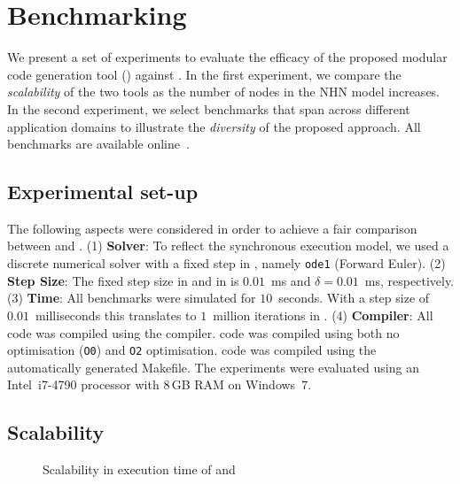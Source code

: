 \section{Benchmarking}
\label{sec:benchmarking}

We present a set of experiments to evaluate the efficacy of the proposed
modular code generation tool (\ourTool) against \simulink.  In the first 
experiment, we compare the \emph{scalability} of the two tools as the 
number of nodes in the \ac{NHN} model increases.  In the second experiment, we 
select benchmarks that span across different application domains 
to illustrate the \emph{diversity} 
of the proposed approach.  All benchmarks are 
available online~\cite{DATEBenchmarks}.


\subsection{Experimental set-up}
\label{sec:experimentalSetUp}
The following aspects were considered in order to achieve a fair
comparison between \ourTool and \simulink. 
(1) \textbf{Solver}: To reflect the synchronous execution model, we
  used a discrete numerical solver with a fixed step in \simulink,
  namely \texttt{ode1} (Forward Euler).
(2) 
\textbf{Step Size}: The fixed step size in \simulink and in \ourTool
  is  $0.01$~ms and $\delta = 0.01$~ms, respectively.
(3) 
\textbf{Time}: All benchmarks were simulated for $10$~seconds.
  With a step size of $0.01$~milliseconds this
  translates to $1$~million iterations in \ourTool.
  (4)
\textbf{Compiler}: All code was compiled using the \compiler
  compiler.  \ourTool code was compiled using both no optimisation
  (\texttt{O0}) and \texttt{O2} optimisation.  \simulink code was
  compiled using the automatically generated Makefile.
The experiments were evaluated using an Intel~i7-4790 processor with
$8$\,GB RAM on Windows~$7$.



\subsection{Scalability}
\vspace{-0.5cm}
\begin{figure}[htbp]
  \centering
  
  \setlength{\abovecaptionskip}{-10pt}
  \caption{Scalability in  execution time of \simulink and 
  \ourTool %
  }
  \label{fig:scalability}
  \vspace{-0.3cm}
\end{figure}

